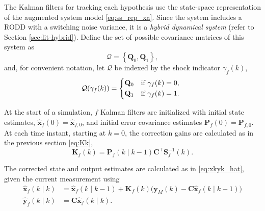 {{The Kalman filters for tracking each hypothesis use the state-space representation of the augmented system model \eqref{eq:ss_rep_xa}. Since the system includes a \gls{RODD} with a switching noise variance, it is a \textit{hybrid dynamical system} (refer to Section \ref{sec:lit-hybrid}). Define the set of possible covariance matrices of this system as
\begin{equation} \label{eq:init_Q_R}
	\mathcal{Q} = \left\{\mathbf{Q}_0, \mathbf{Q}_1\right\},
\end{equation}
and, for convenient notation, let $\mathcal{Q}$ be indexed by the shock indicator $\gamma_f(k)$,
\begin{equation} \label{eq:init_Q}
	\mathcal{Q}(\gamma_f(k)) = 
	\begin{cases*}
		\mathbf{Q}_0 & \text{if} $\gamma_f(k)=0$, \\
		\mathbf{Q}_1 & \text{if} $\gamma_f(k)=1$.
	\end{cases*}
\end{equation}

At the start of a simulation, $f$ Kalman filters are initialized with initial state estimates, $\mathbf{\hat{x}}_f(0) = \mathbf{\hat{x}}_{f,0}$, and initial error covariance estimates $	\mathbf{P}_f(0) = \mathbf{P}_{f,0}$. At each time instant, starting at $k=0$, the correction gains are calculated as in the previous section \eqref{eq:Kk},
%
\begin{equation} \label{eq:Kfk}
	\mathbf{K}_f(k) = \mathbf{P}_f(k \mid k-1)\mathbf{C}^\intercal \mathbf{S}_f^{-1}(k).
\end{equation}

The corrected state and output estimates are calculated as in \eqref{eq:xkyk_hat}, given the current measurement using
%
%
\begin{equation} \label{eq:xfkyfk_hat}
	\begin{aligned}
		\mathbf{\hat{x}}_f(k \mid k) &= \mathbf{\hat{x}}_f(k \mid k-1) + \mathbf{K}_f(k) \big( \mathbf{y}_M(k) - \mathbf{C} \mathbf{\hat{x}}_f(k \mid k-1) \big) \\
		\mathbf{\hat{y}}_f(k \mid k) &= \mathbf{C} \mathbf{\hat{x}}_f(k \mid k).
	\end{aligned}
\end{equation}

}}
